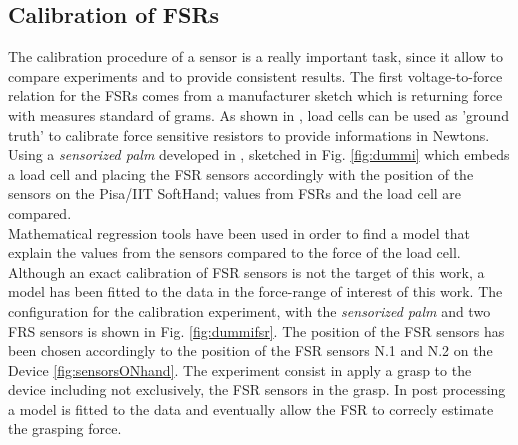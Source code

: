 
\subsection{Calibration of FSRs}
The calibration procedure of a sensor is a really important task, since it allow to compare experiments and to provide consistent results. 
The first voltage-to-force relation for the FSRs comes from a manufacturer sketch which is returning force with measures standard of grams.
As shown in \cite{calibFSR}, load cells can be used as 'ground truth' to calibrate force sensitive resistors to provide informations in Newtons. 
Using a \textit{sensorized palm} developed in \cite{knoop2017handshakiness}, sketched in Fig. \ref{fig:dummi} which embeds a load cell and placing the FSR sensors accordingly with the position of the sensors on the Pisa/IIT SoftHand; values from FSRs and the load cell are compared.\\
Mathematical regression tools have been used in order to find a model that explain the values from the sensors compared to the force of the load cell.
Although an exact calibration of FSR sensors is not the target of this work, a model has been fitted to the data in the force-range of interest of this work.
The configuration for the calibration experiment, with the \textit{sensorized palm} and two FRS sensors is shown in Fig. \ref{fig:dummifsr}. 
The position of the FSR sensors has been chosen accordingly to the position of the FSR sensors N.1 and N.2 on the Device \ref{fig:sensorsONhand}.
The experiment consist in apply a grasp to the device including not exclusively, the FSR sensors in the grasp. In post processing a model is fitted to the data and eventually allow the FSR to correcly estimate the grasping force.

